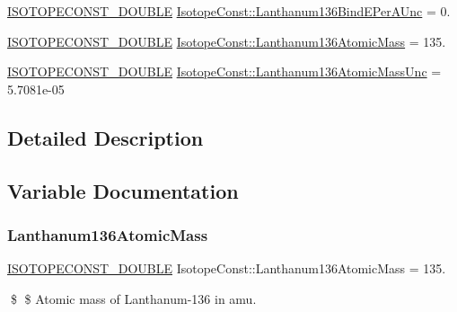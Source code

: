 \begin{DoxyCompactItemize}
\mbox{\hyperlink{group___isotope_const-_macros_ga8f45a7272ce02c0b4c65c44636ed719a}{I\+S\+O\+T\+O\+P\+E\+C\+O\+N\+S\+T\+\_\+\+D\+O\+U\+B\+LE}} \mbox{\hyperlink{group___isotope_const-_lanthanum-_la136_gafd6b3f8e76f0dd8298f70008486852ad}{Isotope\+Const\+::\+Lanthanum136\+Bind\+E\+Per\+A\+Unc}} = 0.
\item 
\mbox{\hyperlink{group___isotope_const-_macros_ga8f45a7272ce02c0b4c65c44636ed719a}{I\+S\+O\+T\+O\+P\+E\+C\+O\+N\+S\+T\+\_\+\+D\+O\+U\+B\+LE}} \mbox{\hyperlink{group___isotope_const-_lanthanum-_la136_ga2d19ec63a69b4a47f01c653a99d40f2c}{Isotope\+Const\+::\+Lanthanum136\+Atomic\+Mass}} = 135.
\item 
\mbox{\hyperlink{group___isotope_const-_macros_ga8f45a7272ce02c0b4c65c44636ed719a}{I\+S\+O\+T\+O\+P\+E\+C\+O\+N\+S\+T\+\_\+\+D\+O\+U\+B\+LE}} \mbox{\hyperlink{group___isotope_const-_lanthanum-_la136_gad704a811721120371060b6a2aff2f29c}{Isotope\+Const\+::\+Lanthanum136\+Atomic\+Mass\+Unc}} = 5.\+7081e-\/05
\end{DoxyCompactItemize}


\subsection{Detailed Description}


\subsection{Variable Documentation}
\mbox{\label{group___isotope_const-_lanthanum-_la136_ga2d19ec63a69b4a47f01c653a99d40f2c}} 
\subsubsection{\texorpdfstring{Lanthanum136\+Atomic\+Mass}{Lanthanum136AtomicMass}}
{\footnotesize\ttfamily \mbox{\hyperlink{group___isotope_const-_macros_ga8f45a7272ce02c0b4c65c44636ed719a}{I\+S\+O\+T\+O\+P\+E\+C\+O\+N\+S\+T\+\_\+\+D\+O\+U\+B\+LE}} Isotope\+Const\+::\+Lanthanum136\+Atomic\+Mass = 135.}

\$ \$ Atomic mass of Lanthanum-\/136 in amu. \mbox{\label{group___isotope_const-_lanthanum-_la136_gad704a811721120371060b6a2aff2f29c}} 

